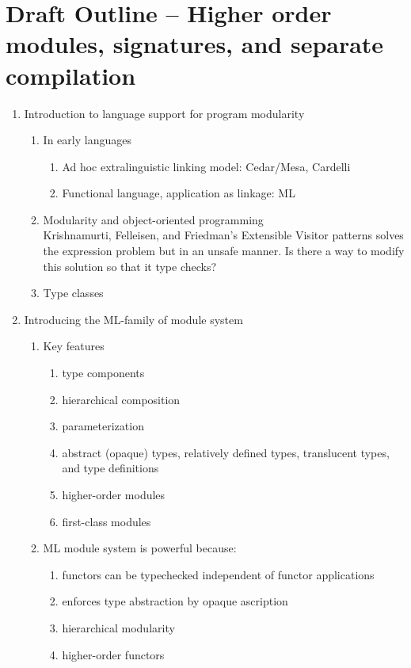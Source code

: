 \documentclass[12pt]{article}
\begin{document}
\section{Draft Outline -- Higher order modules, signatures, and separate compilation}				
\begin{enumerate}
	\item Introduction to language support for program modularity
	\begin{enumerate}
		\item In early languages
		\begin{enumerate}
			\item Ad hoc extralinguistic linking model: Cedar/Mesa, Cardelli \cite{cardelli97}
			\item Functional language, application as linkage: ML 
		\end{enumerate}
		\item Modularity and object-oriented programming\\
Krishnamurti, Felleisen, and Friedman's Extensible Visitor patterns solves the expression problem but in an unsafe manner. Is there a way to modify this solution so that it type checks? 
		\item Type classes
	\end{enumerate}
	\item Introducing the ML-family of module system
	\begin{enumerate}
		\item Key features
		\begin{enumerate}
			\item type components
			\item hierarchical composition
			\item parameterization
			\item abstract (opaque) types, relatively defined types, translucent types, and type definitions 
			\item higher-order modules
			\item first-class modules
		\end{enumerate}
		\item ML module system is powerful because:
		\begin{enumerate}
			\item functors can be typechecked independent of functor applications
			\item enforces type abstraction by opaque ascription
			\item hierarchical modularity
			\item higher-order functors

\end{enumerate}
\end{enumerate}
\end{enumerate}
\end{document}
